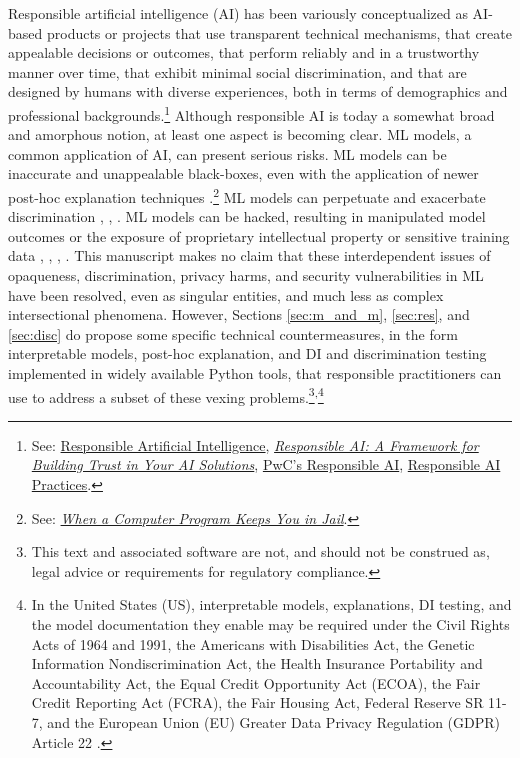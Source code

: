 \documentclass[information,article,submit,moreauthors,pdftex]{definitions/mdpi}
\begin{document}
Responsible artificial intelligence (AI) has been variously conceptualized as AI-based products or projects that use transparent technical mechanisms, that create appealable decisions or outcomes, that perform reliably and in a trustworthy manner over time, that exhibit minimal social discrimination, and that are designed by humans with diverse experiences, both in terms of demographics and professional backgrounds.\footnote{See: \href{https://ec.europa.eu/jrc/communities/sites/jrccties/files/03_dignum_v.pdf}{Responsible Artificial Intelligence}, \href{https://www.accenture.com/_acnmedia/pdf-92/accenture-afs-responsible-ai.pdf}{\textit{Responsible AI: A Framework for Building Trust in Your AI Solutions}}, \href{https://www.pwc.com/us/en/services/consulting/analytics/artificial-intelligence/what-is-responsible-ai.html}{PwC's Responsible AI}, \href{https://ai.google/responsibilities/responsible-ai-practices/}{Responsible AI Practices}.} Although responsible AI is today a somewhat broad and amorphous notion, at least one aspect is becoming clear. ML models, a common application of AI, can present serious risks. ML models can be inaccurate and unappealable black-boxes, even with the application of newer post-hoc explanation techniques \cite{please_stop}.\footnote{See: \href{https://www.nytimes.com/2017/06/13/opinion/how-computers-are-harming-criminal-justice.html}{\textit{When a Computer Program Keeps You in Jail}}.} ML models can perpetuate and exacerbate discrimination \cite{feldman2015certifying}, \cite{dwork2012fairness}, \cite{gender_shades}.  ML models can be hacked, resulting in manipulated model outcomes or the exposure of proprietary intellectual property or sensitive training data \cite{security_of_ml}, \cite{model_stealing}, \cite{membership_inference}, \cite{shokri2019privacy}. This manuscript makes no claim that these interdependent issues of opaqueness, discrimination, privacy harms, and security vulnerabilities in ML have been resolved, even as singular entities, and much less as complex intersectional phenomena. However, Sections \ref{sec:m_and_m}, \ref{sec:res}, and \ref{sec:disc} do propose some specific technical countermeasures, in the form interpretable models, post-hoc explanation, and DI and discrimination testing implemented in widely available Python tools, that responsible practitioners can use to address a subset of these vexing problems.\footnote{This text and associated software are not, and should not be construed as, legal advice or requirements for regulatory compliance.}\textsuperscript{,}\footnote{In the United States (US), interpretable models, explanations, DI testing, and the model documentation they enable may be required under the Civil Rights Acts of 1964 and 1991, the Americans with Disabilities Act, the Genetic Information Nondiscrimination Act, the Health Insurance Portability and Accountability Act, the Equal Credit Opportunity Act (ECOA), the Fair Credit Reporting Act (FCRA), the Fair Housing Act, Federal Reserve SR 11-7, and the European Union (EU) Greater Data Privacy Regulation (GDPR) Article 22 \cite{ff_interpretability}.} 
\end{document}
